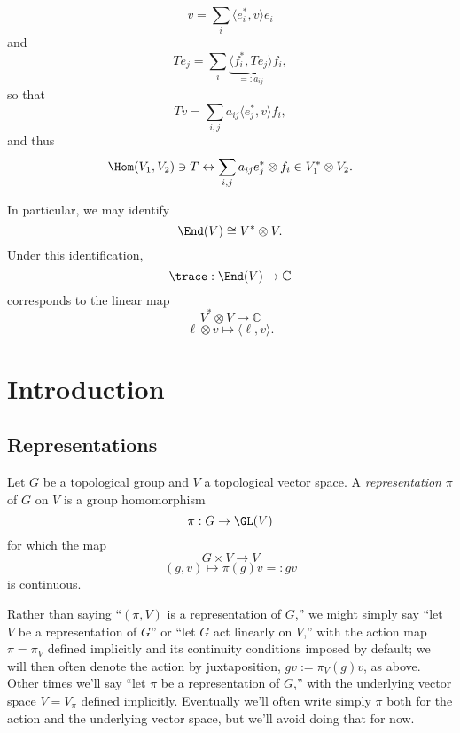 \documentclass[reqno]{amsart} 
\begin{document}
\begin{equation*}
  v = \sum_i \langle e_i^*, v \rangle e_i
\end{equation*}
and
\begin{equation*}
  T e_j = \sum_i \underbrace{ \langle f_i^*, T e_j \rangle }_{=: a_{ij} } f_i,
\end{equation*}
so that
\begin{equation*}
  T v = \sum_{i,j} a_{i j} \langle e_j^*, v \rangle f_i,
\end{equation*}
and thus
\begin{equation*}
  \Hom(V_1,V_2) \ni T \leftrightarrow \sum_{i,j} a_{i j} e_j^* \otimes f_i \in V_1^* \otimes V_2.
\end{equation*}

In particular, we may identify
\begin{equation*}
  \End(V) \cong V^* \otimes V.
\end{equation*}
Under this identification,
\begin{equation*}
  \trace : \End(V) \rightarrow \mathbb{C}
\end{equation*}
corresponds to the linear map
\begin{equation*}
  V^* \otimes V \rightarrow \mathbb{C}
\end{equation*}
\begin{equation*}
  \ell \otimes v \mapsto \langle \ell, v \rangle.
\end{equation*}

\newpage


\section{Introduction}
\subsection{Representations}
\begin{definition}
  Let $G$ be a topological group and $V$ a topological vector space.  A \emph{representation} $\pi$ of $G$ on $V$ is a group homomorphism
  \begin{equation*}
    \pi : G \rightarrow \GL(V)
  \end{equation*}
  for which the map
  \begin{equation*}
    G \times V \rightarrow V
  \end{equation*}
  \begin{equation*}
    (g,v) \mapsto \pi(g) v =: g v
  \end{equation*}
  is continuous.
\end{definition}
Rather than saying ``$(\pi,V)$ is a representation of $G$,'' we might simply say ``let $V$ be a representation of $G$'' or ``let $G$ act linearly on $V$,'' with the action map $\pi = \pi_V$ defined implicitly and its continuity conditions imposed by default; we will then often denote the action by juxtaposition, $g v := \pi_V(g) v$, as above.  Other times we'll say ``let $\pi$ be a representation of $G$,'' with the underlying vector space $V = V_\pi$ defined implicitly.  Eventually we'll often write simply $\pi$ both for the action and the underlying vector space, but we'll avoid doing that for now.
\end{document}
